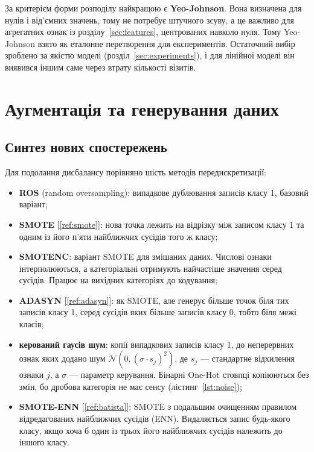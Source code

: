 \documentclass[14pt,a4paper]{extreport}
\begin{document}
За критерієм форми розподілу найкращою є \textbf{Yeo-Johnson}. Вона визначена для нулів і від'ємних значень, тому не потребує штучного зсуву, а це важливо для агрегатних ознак із розділу~\ref{sec:features}, центрованих навколо нуля. Тому Yeo-Johnson взято як еталонне перетворення для експериментів. Остаточний вибір зроблено за якістю моделі (розділ~\ref{sec:experiments}), і для лінійної моделі він виявився іншим саме через втрату кількості візитів.

\section{Аугментація та генерування даних}

\subsection{Синтез нових спостережень}
\label{sec:synthesis}

Для подолання дисбалансу порівняно шість методів передискретизації:

\begin{itemize}
\item \textbf{ROS} (random oversampling): випадкове дублювання записів класу 1, базовий варіант;
\item \textbf{SMOTE} [\ref{ref:smote}]: нова точка лежить на відрізку між записом класу 1 та одним із його п'яти найближчих сусідів того ж класу;
\item \textbf{SMOTENC}: варіант SMOTE для змішаних даних. Числові ознаки інтерполюються, а категоріальні отримують найчастіше значення серед сусідів. Працює на вихідних категоріях до кодування;
\item \textbf{ADASYN} [\ref{ref:adasyn}]: як SMOTE, але генерує більше точок біля тих записів класу 1, серед сусідів яких більше записів класу 0, тобто біля межі класів;
\item \textbf{керований гаусів шум}: копії випадкових записів класу 1, до неперервних ознак яких додано шум $\mathcal{N}(0, (\sigma \cdot s_j)^2)$, де $s_j$ --- стандартне відхилення ознаки $j$, а $\sigma$ --- параметр керування. Бінарні One-Hot стовпці копіюються без змін, бо дробова категорія не має сенсу (лістинг~\ref{lst:noise});
\item \textbf{SMOTE-ENN} [\ref{ref:batista}]: SMOTE з подальшим очищенням правилом відредагованих найближчих сусідів (ENN). Видаляється запис будь-якого класу, якщо хоча б один із трьох його найближчих сусідів належить до іншого класу.
\end{itemize}
\end{document}
